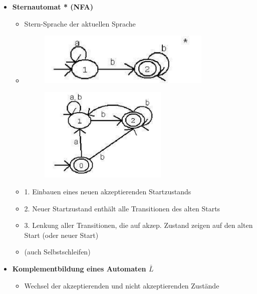 \documentclass[11pt,a4paper]{article}
\begin{document}
\begin{itemize}
\begin{itemize}
	\end{itemize}
	
\pagebreak
	
\item {\large \textbf{Sternautomat * (NFA)}}
	\begin{itemize}
	
	\item Stern-Sprache der aktuellen Sprache	
	
	\item[]
		\begin{minipage}{0.45\textwidth}
				\begin{figure}[H]
				\includegraphics[height=2.5cm]{Bilder/stern1}
				\end{figure}
			\end{minipage}
			\begin{minipage}[t]{0.45\textwidth}
				\vspace{-1.75cm}
				\begin{figure}[H]
				\includegraphics[height=4.5cm]{Bilder/stern2}
				\end{figure}
			\end{minipage}
	
	\item 1. Einbauen eines neuen akzeptierenden Startzustands
	\item 2. Neuer Startzustand enthält alle Transitionen des alten Starts
	\item 3. Lenkung aller Transitionen, die auf akzep. Zustand zeigen auf den alten Start (oder neuer Start)
	\item (auch Selbstschleifen)
	
	\end{itemize}
	
	
\item {\large \textbf{Komplementbildung eines Automaten $\bar{L}$}}
	\begin{itemize}
	\item Wechsel der akzeptierenden und nicht akzeptierenden Zustände
	\end{itemize}
		

\end{itemize}
\end{document}

